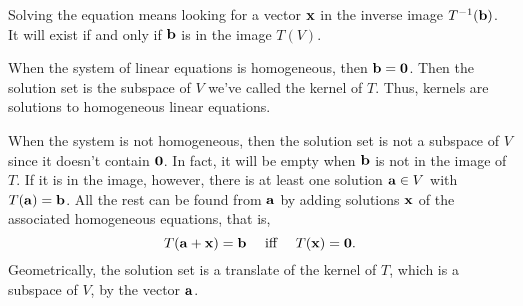 Solving the equation means looking for a vector ${\bf x}$ in the inverse image
$T^{-1}({\bf b})$.  It will exist if and only if ${\bf b}$ is in the image $T(V)$.

When the system of linear equations is homogeneous, then ${\bf b}={\bf 0}$.  Then the solution set is the subspace of $V$ we've called the kernel of $T$.  Thus, kernels are solutions to homogeneous linear equations.

When the system is not homogeneous, then the solution set is not a subspace of $V$ since it doesn't contain $\bf 0$.  In fact, it will be empty when $\bf b$ is not in the image of $T$.  If it is in the image, however, there is at least one solution ${\bf a}\in V$ with $T({\bf a})={\bf b}$.  All the rest  can be found from $\bf a$ by adding solutions $\bf x$ of the associated homogeneous equations, that is, 
$$T({\bf a}+{\bf x})={\bf b}\quad\mbox{ iff }\quad T({\bf x})={\bf 0}.$$
Geometrically, the solution set is a translate of the kernel of $T$, which is a subspace of $V$, by the vector $\bf a$.

